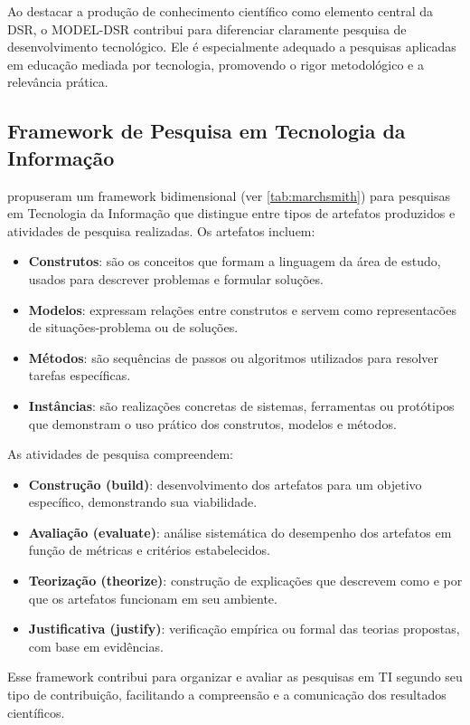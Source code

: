 Ao destacar a produção de conhecimento científico como elemento central da DSR, o MODEL-DSR contribui para diferenciar claramente pesquisa de desenvolvimento tecnológico. Ele é especialmente adequado a pesquisas aplicadas em educação mediada por tecnologia, promovendo o rigor metodológico e a relevância prática.

\subsection{Framework de Pesquisa em Tecnologia da Informação}

\citet{march1995design} propuseram um framework bidimensional (ver \autoref{tab:marchsmith}) para pesquisas em Tecnologia da Informação que distingue entre tipos de artefatos produzidos e atividades de pesquisa realizadas. Os artefatos incluem:
\begin{itemize}
    \item \textbf{Construtos}: são os conceitos que formam a linguagem da área de estudo, usados para descrever problemas e formular soluções.
    \item \textbf{Modelos}: expressam relações entre construtos e servem como representacões de situações-problema ou de soluções.
    \item \textbf{Métodos}: são sequências de passos ou algoritmos utilizados para resolver tarefas específicas.
    \item \textbf{Instâncias}: são realizações concretas de sistemas, ferramentas ou protótipos que demonstram o uso prático dos construtos, modelos e métodos.
\end{itemize}

As atividades de pesquisa compreendem:
\begin{itemize}
    \item \textbf{Construção (build)}: desenvolvimento dos artefatos para um objetivo específico, demonstrando sua viabilidade.
    \item \textbf{Avaliação (evaluate)}: análise sistemática do desempenho dos artefatos em função de métricas e critérios estabelecidos.
    \item \textbf{Teorização (theorize)}: construção de explicações que descrevem como e por que os artefatos funcionam em seu ambiente.
    \item \textbf{Justificativa (justify)}: verificação empírica ou formal das teorias propostas, com base em evidências.
\end{itemize}

Esse framework contribui para organizar e avaliar as pesquisas em TI segundo seu tipo de contribuição, facilitando a compreensão e a comunicação dos resultados científicos.

